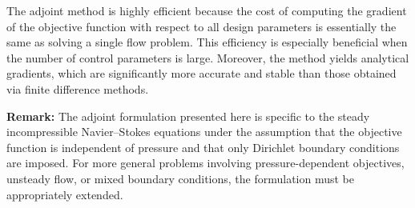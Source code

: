 The adjoint method is highly efficient because the cost of computing the gradient of the objective function with respect to all design parameters is essentially the same as solving a single flow problem. This efficiency is especially beneficial when the number of control parameters is large. Moreover, the method yields analytical gradients, which are significantly more accurate and stable than those obtained via finite difference methods.

\textbf{Remark:} The adjoint formulation presented here is specific to the steady incompressible Navier–Stokes equations under the assumption that the objective function is independent of pressure and that only Dirichlet boundary conditions are imposed.  For more general problems involving pressure-dependent objectives, unsteady flow, or mixed boundary conditions, the formulation must be appropriately extended.


%

